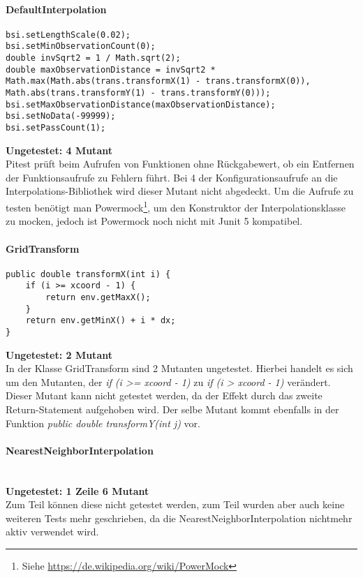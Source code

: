 \paragraph{DefaultInterpolation}
\begin{lstlisting}[style=customjava]
bsi.setLengthScale(0.02);
bsi.setMinObservationCount(0);
double invSqrt2 = 1 / Math.sqrt(2);
double maxObservationDistance = invSqrt2 * Math.max(Math.abs(trans.transformX(1) - trans.transformX(0)), Math.abs(trans.transformY(1) - trans.transformY(0)));
bsi.setMaxObservationDistance(maxObservationDistance);
bsi.setNoData(-99999);
bsi.setPassCount(1);
\end{lstlisting}
\textbf{Ungetestet: 4 Mutant}
\\
Pitest prüft beim Aufrufen von Funktionen ohne Rückgabewert, ob ein Entfernen der Funktionsaufrufe zu Fehlern führt.
Bei 4 der Konfigurationsaufrufe an die Interpolations-Bibliothek wird dieser Mutant nicht abgedeckt.
Um die Aufrufe zu testen benötigt man Powermock\footnote{Siehe \url{https://de.wikipedia.org/wiki/PowerMock}}, um den Konstruktor der Interpolationsklasse zu mocken, jedoch ist Powermock noch nicht mit Junit 5 kompatibel.

\paragraph{GridTransform}
\begin{lstlisting}[style=customjava]
public double transformX(int i) {
    if (i >= xcoord - 1) {
        return env.getMaxX();
    }
    return env.getMinX() + i * dx;
}
\end{lstlisting}
\textbf{Ungetestet: 2 Mutant}
\\
In der Klasse GridTransform sind 2 Mutanten ungetestet.
Hierbei handelt es sich um den Mutanten, der \textit{if (i >= xcoord - 1)} zu \textit{if (i > xcoord - 1)} verändert.
Dieser Mutant kann nicht getestet werden, da der Effekt durch das zweite Return-Statement aufgehoben wird.
Der selbe Mutant kommt ebenfalls in der Funktion \textit{public double transformY(int j)} vor.

\paragraph{NearestNeighborInterpolation}
\mbox{}\\
\textbf{Ungetestet: 1 Zeile 6 Mutant}
\\
Zum Teil können diese nicht getestet werden, zum Teil wurden aber auch keine weiteren Tests mehr geschrieben, da die NearestNeighborInterpolation nichtmehr aktiv verwendet wird.
